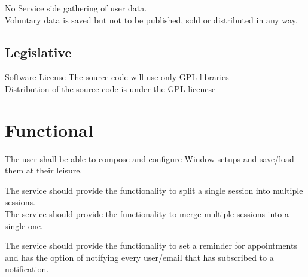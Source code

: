 \documentclass[8pt]{beamer}
\begin{document}
\begin{frame}
No Service side gathering of user data.\\\pause
Voluntary data is saved but not to be published, sold or distributed in any way.
\end{frame}

\subsection{Legislative}

\begin{frame}{Software License}
The source code will use only GPL libraries \\\pause
Distribution of the source code is under the GPL licencse
\end{frame}
\section{Functional}
\begin{frame}
The user shall be able to compose and configure Window setups and save/load them at their leisure.
\end{frame}
\begin{frame}
 
The service should provide the functionality to split a single session
into multiple sessions. 
\\\pause The service should provide the functionality to merge multiple sessions into a single one.
\end{frame}

\begin{frame}
The service should provide the functionality to set a reminder for appointments and has the option of notifying every user/email that has subscribed to a notification. 
\end{frame}
\end{document}
